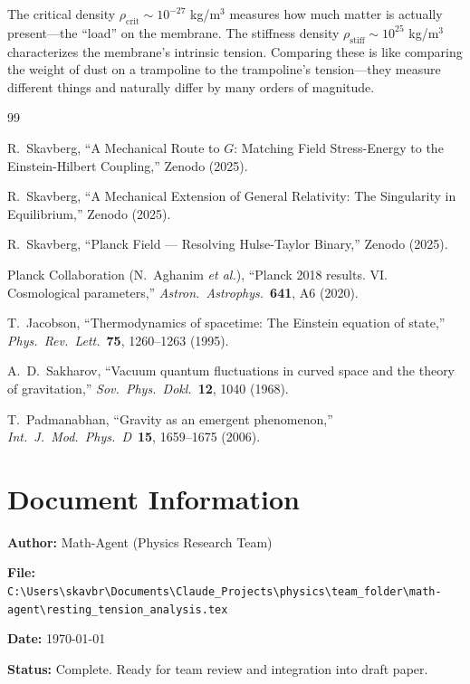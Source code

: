 \documentclass[11pt,a4paper]{article}
\newcommand{\rhocrit}{\ensuremath{\rho_{\mathrm{crit}}}}
\newcommand{\rhostiff}{\ensuremath{\rho_{\mathrm{stiff}}}}
\theoremstyle{definition}
\begin{document}
The critical density $\rhocrit \sim 10^{-27}$ kg/m$^3$ measures how much matter is actually present---the ``load'' on the membrane. The stiffness density $\rhostiff \sim 10^{25}$ kg/m$^3$ characterizes the membrane's intrinsic tension. Comparing these is like comparing the weight of dust on a trampoline to the trampoline's tension---they measure different things and naturally differ by many orders of magnitude.

\begin{thebibliography}{99}

R.~Skavberg, ``A Mechanical Route to $G$: Matching Field Stress-Energy to the Einstein-Hilbert Coupling,'' Zenodo (2025).

R.~Skavberg, ``A Mechanical Extension of General Relativity: The Singularity in Equilibrium,'' Zenodo (2025).

R.~Skavberg, ``Planck Field --- Resolving Hulse-Taylor Binary,'' Zenodo (2025).

Planck Collaboration (N.~Aghanim \emph{et al.}), ``Planck 2018 results. VI. Cosmological parameters,'' \emph{Astron.\ Astrophys.}\ \textbf{641}, A6 (2020).

T.~Jacobson, ``Thermodynamics of spacetime: The Einstein equation of state,'' \emph{Phys.\ Rev.\ Lett.}\ \textbf{75}, 1260--1263 (1995).

A.~D.~Sakharov, ``Vacuum quantum fluctuations in curved space and the theory of gravitation,'' \emph{Sov.\ Phys.\ Dokl.}\ \textbf{12}, 1040 (1968).

T.~Padmanabhan, ``Gravity as an emergent phenomenon,'' \emph{Int.\ J.\ Mod.\ Phys.\ D}\ \textbf{15}, 1659--1675 (2006).

\end{thebibliography}

\section*{Document Information}

\textbf{Author:} Math-Agent (Physics Research Team)

\textbf{File:} \texttt{C:\textbackslash Users\textbackslash skavbr\textbackslash Documents\textbackslash Claude\_Projects\textbackslash physics\textbackslash team\_folder\textbackslash math-agent\textbackslash resting\_tension\_analysis.tex}

\textbf{Date:} \today

\textbf{Status:} Complete. Ready for team review and integration into draft paper.
\end{document}
